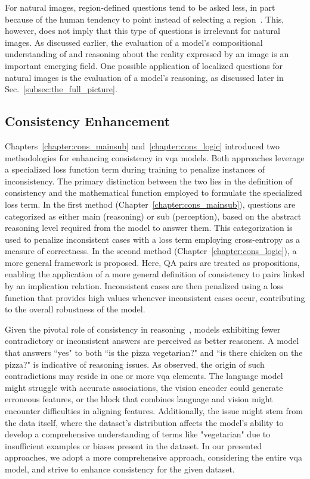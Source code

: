 For natural images, region-defined questions tend to be asked less, in part because of the human tendency to point instead of selecting a region~\cite{mani2020point}. This, however, does not imply that this type of questions is irrelevant for natural images. As discussed earlier, the evaluation of a model's compositional understanding of and reasoning about the reality expressed by an image is an important emerging field. One possible application of localized questions for natural images is the evaluation of a model's reasoning, as discussed later in Sec.~\ref{subsec:the_full_picture}.

\subsection{Consistency Enhancement}
Chapters~\ref{chapter:cons_mainsub} and~\ref{chapter:cons_logic} introduced two methodologies for enhancing consistency in \gls{vqa} models. Both approaches leverage a specialized loss function term during training to penalize instances of inconsistency. The primary distinction between the two lies in the definition of consistency and the mathematical function employed to formulate the specialized loss term. In the first method (Chapter~\ref{chapter:cons_mainsub}), questions are categorized as either main (reasoning) or sub (perception), based on the abstract reasoning level required from the model to answer them. This categorization is used to penalize inconsistent cases with a loss term employing cross-entropy as a measure of correctness. In the second method (Chapter~\ref{chapter:cons_logic}), a more general framework is proposed. Here, QA pairs are treated as propositions, enabling the application of a more general definition of consistency to pairs linked by an implication relation. Inconsistent cases are then penalized using a loss function that provides high values whenever inconsistent cases occur, contributing to the overall robustness of the model.


Given the pivotal role of consistency in reasoning~\cite{selvaraju2020squinting,yuan2021perception,jing2022maintaining}, models exhibiting fewer contradictory or inconsistent answers are perceived as better reasoners. A model that answers ``yes" to both ``is the pizza vegetarian?" and ``is there chicken on the pizza?" is indicative of reasoning issues. As observed, the origin of such contradictions may reside in one or more \gls{vqa} elements. The language model might struggle with accurate associations, the vision encoder could generate erroneous features, or the block that combines language and vision might encounter difficulties in aligning features. Additionally, the issue might stem from the data itself, where the dataset's distribution affects the model's ability to develop a comprehensive understanding of terms like "vegetarian" due to insufficient examples or biases present in the dataset. In our presented approaches, we adopt a more comprehensive approach, considering the entire \gls{vqa} model, and strive to enhance consistency for the given dataset.

